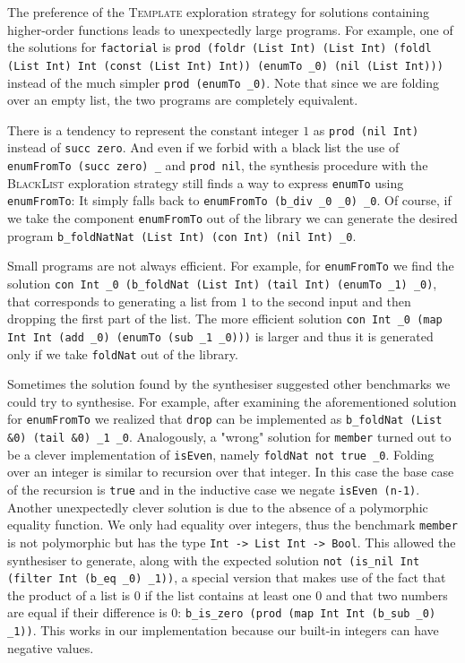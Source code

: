 The preference of the \textsc{Template} exploration strategy for solutions containing higher-order functions leads to unexpectedly large programs. For example, one of the solutions for \lstinline?factorial? is \lstinline?prod (foldr (List Int) (List Int) (foldl (List Int) Int (const (List Int) Int)) (enumTo _0) (nil (List Int)))? instead of the much simpler \lstinline?prod (enumTo _0)?. Note that since we are folding over an empty list, the two programs are completely equivalent.

There is a tendency to represent the constant integer $1$ as \lstinline?prod (nil Int)? instead of \lstinline?succ zero?. And even if we forbid with a black list the use of \lstinline?enumFromTo (succ zero) _? and \lstinline?prod nil?, the synthesis procedure with the \textsc{BlackList} exploration strategy still finds a way to express \lstinline?enumTo? using \lstinline?enumFromTo?: It simply falls back to \lstinline?enumFromTo (b_div _0 _0) _0?. Of course, if we take the component \lstinline?enumFromTo? out of the library we can generate the desired program \lstinline?b_foldNatNat (List Int) (con Int) (nil Int) _0?.

Small programs are not always efficient. For example, for \lstinline?enumFromTo? we find the solution \lstinline?con Int _0 (b_foldNat (List Int) (tail Int) (enumTo _1) _0)?, that corresponds to generating a list from $1$ to the second input and then dropping the first part of the list. The more efficient solution \lstinline?con Int _0 (map Int Int (add _0) (enumTo (sub _1 _0)))? is larger and thus it is generated only if we take \lstinline?foldNat? out of the library.

Sometimes the solution found by the synthesiser suggested other benchmarks we could try to synthesise. For example, after examining the aforementioned solution for \lstinline?enumFromTo? we realized that \lstinline?drop? can be implemented as \lstinline?b_foldNat (List &0) (tail &0) _1 _0?. Analogously, a "wrong" solution for \lstinline?member? turned out to be a clever implementation of \lstinline?isEven?, namely \lstinline?foldNat not true _0?. Folding over an integer is similar to recursion over that integer. In this case the base case of the recursion is \lstinline?true? and in the inductive case we negate \lstinline?isEven (n-1)?.\\
Another unexpectedly clever solution is due to the absence of a polymorphic equality function. We only had equality over integers, thus the benchmark \lstinline?member? is not polymorphic but has the type \lstinline?Int -> List Int -> Bool?. This allowed the synthesiser to generate, along with the expected solution \lstinline?not (is_nil Int (filter Int (b_eq _0) _1))?, a special version that makes use of the fact that the product of a list is $0$ if the list contains at least one $0$ and that two numbers are equal if their difference is $0$: \lstinline?b_is_zero (prod (map Int Int (b_sub _0) _1))?. This works in our implementation because our built-in integers can have negative values.


